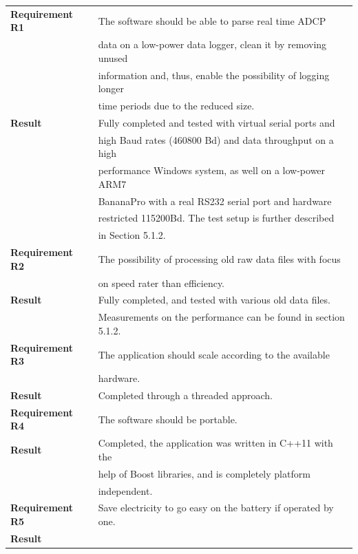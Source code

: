 \begin{table}[ht]
\centering
	\begin{tabular}{|l|l|}
	  \hline
	  	\textbf{Requirement R1} 
	  	& The software should be able to parse real time ADCP\\ 
	  	& data on a low-power data logger, clean it by removing unused\\
	  	& information and, thus, enable the possibility of logging longer\\
	  	& time periods due to the reduced size.\\ \hline
	  	\textbf{Result} 
	  	& Fully completed and tested with virtual serial ports and\\ 
	  	& high Baud rates (460800 Bd) and data throughput on a high \\ 
	  	& performance Windows system, as well on a low-power ARM7 \\ 
	  	& BananaPro with a real RS232 serial port and hardware \\ 
	  	& restricted 115200Bd. The test setup is further described \\
	  	& in Section 5.1.2.\\
	  \hline
	  \hline
	  	\textbf{Requirement R2} 
	  	& The possibility of processing old raw data files with focus\\
	  	& on speed rater than efficiency.\\ \hline
	  	\textbf{Result} 
	  	& Fully completed, and tested with various old data files. \\
	  	& Measurements on the performance can be found in section 5.1.2.\\
	  \hline
	  \hline
	  	\textbf{Requirement R3} 
	  	& The application should scale according to the available\\
	  	& hardware.\\ \hline
	  	\textbf{Result} & Completed through a threaded approach.\\
	  \hline
	  \hline
	  	\textbf{Requirement R4} 
	  	& The software should be portable. \\ \hline
	  	\textbf{Result} 
	  	& Completed, the application was written in C++11 with the\\
	  	& help of Boost libraries, and is completely platform\\
	  	& independent.\\
	  \hline
	  \hline
	  	\textbf{Requirement R5} 
	  	& Save electricity to go easy on the battery if operated by one.\\ \hline
	  	\textbf{Result} 

\end{tabular}
\end{table}
